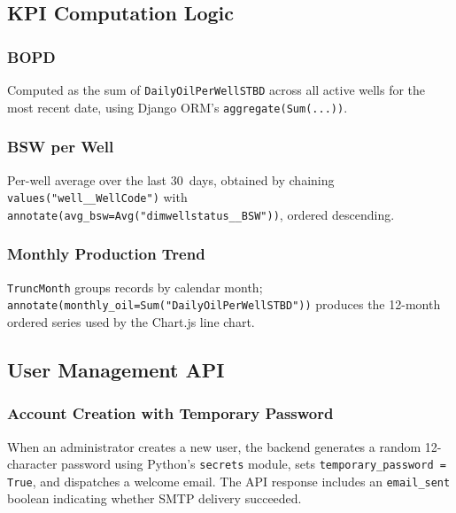 \begin{sloppypar}
\subsection{KPI Computation Logic}

\subsubsection{BOPD}
Computed as the sum of \texttt{DailyOilPerWellSTBD} across all active wells for
the most recent date, using Django ORM's \texttt{aggregate(Sum(...))}.

\subsubsection{BSW per Well}
Per-well average over the last 30~days, obtained by chaining
\texttt{values("well\_\_WellCode")} with
\texttt{annotate(avg\_bsw=Avg("dimwellstatus\_\_BSW"))}, ordered
descending.

\subsubsection{Monthly Production Trend}
\texttt{TruncMonth} groups records by calendar month;
\texttt{annotate(monthly\_oil=Sum("DailyOilPerWellSTBD"))} produces the
12-month ordered series used by the Chart.js line chart.

\subsection{User Management API}

\subsubsection{Account Creation with Temporary Password}

When an administrator creates a new user, the backend generates a random
12-character password using Python's \texttt{secrets} module, sets
\texttt{temporary\_password = True}, and dispatches a welcome email. The API
response includes an \texttt{email\_sent} boolean indicating whether SMTP
delivery succeeded.


\end{sloppypar}
